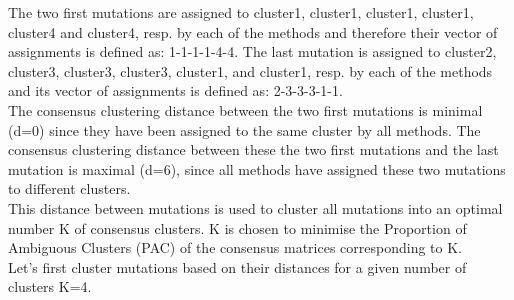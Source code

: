\documentclass{article}\usepackage[]{graphicx}\usepackage[]{color}
\begin{document}
The two first mutations are assigned to cluster1, cluster1, cluster1,
cluster1, cluster4 and cluster4, resp. by each of the methods and therefore their
vector of assignments is defined as: 1-1-1-1-4-4.
The last mutation is assigned to cluster2, cluster3, cluster3, cluster3,
cluster1, and cluster1, resp. by each of the methods and its vector of
assignments is defined as: 2-3-3-3-1-1.\\

The consensus clustering distance between the two first mutations is
minimal (d=0) since they have been assigned to the same cluster by all methods.
The consensus clustering distance between these the two first
mutations and the last mutation is maximal (d=6), since all methods have
assigned these two mutations to different clusters.\\

This distance between mutations is used to cluster all mutations into an
optimal number K of consensus clusters. K is chosen to minimise the
Proportion of Ambiguous Clusters (PAC)
\cite{senbabaoglu_critical_2014} of the consensus matrices
corresponding to K.\\

Let's first cluster mutations based on their distances for a
given number of clusters K=4.\\
\end{document}
